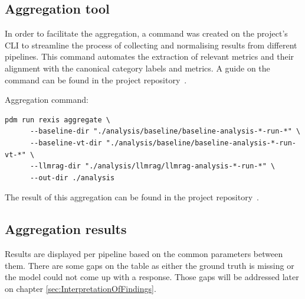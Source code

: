 \subsection{Aggregation tool}\label{subsec:AggregationTool}
In order to facilitate the aggregation, a command was created on the project's CLI to streamline
the process of collecting and normalising results from different pipelines. This command automates
the extraction of relevant metrics and their alignment with the canonical category labels and
metrics. A guide on the command can be found in the project
repository~\cite{rexisResultsAggregationGuide}.

Aggregation command:
\begin{verbatim}
pdm run rexis aggregate \
      --baseline-dir "./analysis/baseline/baseline-analysis-*-run-*" \
      --baseline-vt-dir "./analysis/baseline/baseline-analysis-*-run-vt-*" \
      --llmrag-dir "./analysis/llmrag/llmrag-analysis-*-run-*" \
      --out-dir ./analysis
\end{verbatim}

The result of this aggregation can be found in the project
repository~\cite{rexisResultsAggregationReport}.

\subsection{Aggregation results}\label{subsec:AggregationResults}
Results are displayed per pipeline based on the common parameters between them. There are some gaps
on the table as either the ground truth is missing or the model could not come up with a response.
Those gaps will be addressed later on chapter \ref{sec:InterpretationOfFindings}.

